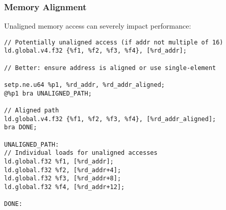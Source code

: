 \subsubsection{Memory Alignment}

Unaligned memory access can severely impact performance:

\begin{lstlisting}[style=ptx]
// Potentially unaligned access (if addr not multiple of 16)
ld.global.v4.f32 {%f1, %f2, %f3, %f4}, [%rd_addr];

// Better: ensure address is aligned or use single-element

setp.ne.u64 %p1, %rd_addr, %rd_addr_aligned;
@%p1 bra UNALIGNED_PATH;

// Aligned path
ld.global.v4.f32 {%f1, %f2, %f3, %f4}, [%rd_addr_aligned];
bra DONE;

UNALIGNED_PATH:
// Individual loads for unaligned accesses
ld.global.f32 %f1, [%rd_addr];
ld.global.f32 %f2, [%rd_addr+4];
ld.global.f32 %f3, [%rd_addr+8];
ld.global.f32 %f4, [%rd_addr+12];

DONE:
\end{lstlisting}

